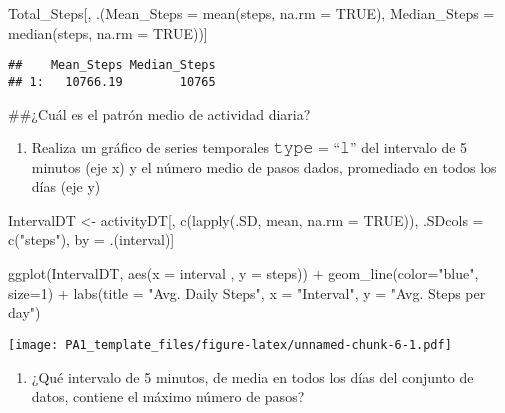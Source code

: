 \documentclass[
]{article}
\newenvironment{Shaded}{\begin{snugshade}}{\end{snugshade}}
\newcommand{\AttributeTok}[1]{\textcolor[rgb]{0.77,0.63,0.00}{#1}}
\newcommand{\ConstantTok}[1]{\textcolor[rgb]{0.00,0.00,0.00}{#1}}
\newcommand{\DecValTok}[1]{\textcolor[rgb]{0.00,0.00,0.81}{#1}}
\newcommand{\FunctionTok}[1]{\textcolor[rgb]{0.00,0.00,0.00}{#1}}
\newcommand{\NormalTok}[1]{#1}
\newcommand{\OtherTok}[1]{\textcolor[rgb]{0.56,0.35,0.01}{#1}}
\newcommand{\SpecialCharTok}[1]{\textcolor[rgb]{0.00,0.00,0.00}{#1}}
\newcommand{\StringTok}[1]{\textcolor[rgb]{0.31,0.60,0.02}{#1}}
\providecommand{\tightlist}{%
  \setlength{\itemsep}{0pt}\setlength{\parskip}{0pt}}
\begin{document}
\begin{Shaded}
\begin{Highlighting}[]
\NormalTok{Total\_Steps[, .(}\AttributeTok{Mean\_Steps =} \FunctionTok{mean}\NormalTok{(steps, }\AttributeTok{na.rm =} \ConstantTok{TRUE}\NormalTok{), }\AttributeTok{Median\_Steps =} \FunctionTok{median}\NormalTok{(steps, }\AttributeTok{na.rm =} \ConstantTok{TRUE}\NormalTok{))]}
\end{Highlighting}
\end{Shaded}

\begin{verbatim}
##    Mean_Steps Median_Steps
## 1:   10766.19        10765
\end{verbatim}

\#\#¿Cuál es el patrón medio de actividad diaria?

\begin{enumerate}
\def\labelenumi{\arabic{enumi}.}
\tightlist
\item
  Realiza un gráfico de series temporales 𝚝𝚢𝚙𝚎 = ``𝚕'' del intervalo de
  5 minutos (eje x) y el número medio de pasos dados, promediado en
  todos los días (eje y)
\end{enumerate}

\begin{Shaded}
\begin{Highlighting}[]
\NormalTok{IntervalDT }\OtherTok{\textless{}{-}}\NormalTok{ activityDT[, }\FunctionTok{c}\NormalTok{(}\FunctionTok{lapply}\NormalTok{(.SD, mean, }\AttributeTok{na.rm =} \ConstantTok{TRUE}\NormalTok{)), .SDcols }\OtherTok{=} \FunctionTok{c}\NormalTok{(}\StringTok{"steps"}\NormalTok{), by }\OtherTok{=}\NormalTok{ .(interval)] }

\FunctionTok{ggplot}\NormalTok{(IntervalDT, }\FunctionTok{aes}\NormalTok{(}\AttributeTok{x =}\NormalTok{ interval , }\AttributeTok{y =}\NormalTok{ steps)) }\SpecialCharTok{+} \FunctionTok{geom\_line}\NormalTok{(}\AttributeTok{color=}\StringTok{"blue"}\NormalTok{, }\AttributeTok{size=}\DecValTok{1}\NormalTok{) }\SpecialCharTok{+} \FunctionTok{labs}\NormalTok{(}\AttributeTok{title =} \StringTok{"Avg. Daily Steps"}\NormalTok{, }\AttributeTok{x =} \StringTok{"Interval"}\NormalTok{, }\AttributeTok{y =} \StringTok{"Avg. Steps per day"}\NormalTok{)}
\end{Highlighting}
\end{Shaded}

\texttt{[image: PA1\_template\_files/figure-latex/unnamed-chunk-6-1.pdf]}

\begin{enumerate}
\def\labelenumi{\arabic{enumi}.}
\setcounter{enumi}{1}
\tightlist
\item
  ¿Qué intervalo de 5 minutos, de media en todos los días del conjunto
  de datos, contiene el máximo número de pasos?
\end{enumerate}
\end{document}
